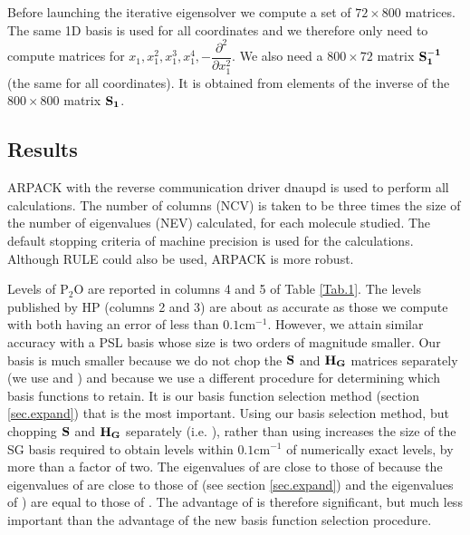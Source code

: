 Before launching the iterative eigensolver we compute a set of $72 \times 800$ matrices.   The same 1D basis is used for all coordinates and we
therefore only need to compute   
%
matrices for  $x_1,x_1^2,x_1^3,x_1^4,-\dfrac{\partial^2}{\partial x_1^2}$.   
%
We also need  a  $800  \times 72$ matrix 
 ${\bf{ S^{-1}_1}}$ (the same for all coordinates).  It is obtained from elements of the inverse of the 
$800 \times  800$  matrix ${{\bf S_1}}$.   
%
%










\subsection{Results}

%
ARPACK with the reverse communication driver dnaupd is used to perform all calculations.  The 
number of columns (NCV) is taken to be three times the size of the number of eigenvalues (NEV) 
calculated,  for each molecule studied. The default stopping criteria of machine precision is 
used for the calculations.\cite{Lehoucq1998b} Although RULE \cite{Tremblay2007} could also be used, ARPACK is more robust.    
  
  
 Levels of    P$_2$O  are reported in columns 4 and 5 of    Table   
\ref{Tab.1}. The levels published by HP %
(columns 2 and 3) 
are about as accurate as those we compute with both having an error of less than $0.1$cm$^{-1}$.  \cite{Halverson2014} 
%
  However, we  attain similar accuracy with  a PSL basis whose size is two orders of magnitude smaller.   
%
Our basis is much smaller because we do not chop the 
 ${\bf {S }}$ and  ${\bf{ H_G }}$  matrices separately (we use  and )
 and because we use a different procedure for determining which basis functions to retain.    
It is our basis function selection method (section \ref{sec.expand})     that is the most important.   
Using our basis selection method, but  chopping  ${\bf{ S }}$ and  ${\bf{ H_G }}$  separately (i.e. ), rather than using    increases  the size of the SG basis required to obtain  levels   within  $0.1$cm$^{-1}$ of  numerically exact levels,      
by more than a factor of two.   
%
The eigenvalues of      %
 are close to those of    %
because the 
 eigenvalues  of   are close to those of    (see section \ref{sec.expand})  and the eigenvalues of   ) are equal to those of 
 .   
%
  The advantage of  is therefore significant, but much less important than the advantage of the new 
basis function selection procedure.     



